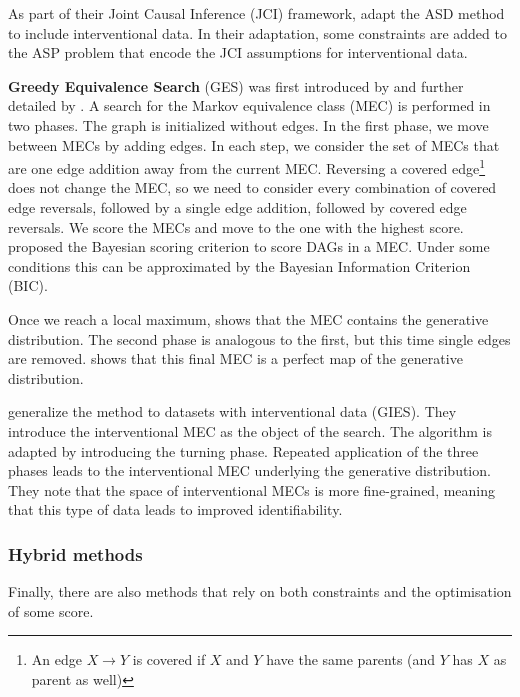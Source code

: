 As part of their Joint Causal Inference (JCI) framework, \citet{mooij2016joint} adapt the ASD method to include interventional data. In their adaptation, some constraints are added to the ASP problem that encode the JCI assumptions for interventional data.

\textbf{Greedy Equivalence Search} (GES) was first introduced by \citet{meek1997graphical} and further detailed by \citet{chickering2002optimal}. A search for the Markov equivalence class (MEC) is performed in two phases. The graph is initialized without edges. In the first phase, we move between MECs by adding edges. In each step, we consider the set of MECs that are one edge addition away from the current MEC. Reversing a covered edge\footnote{An edge $X\to Y$ is covered if $X$ and $Y$ have the same parents (and $Y$ has $X$ as parent as well)} does not change the MEC, so we need to consider every combination of covered edge reversals, followed by a single edge addition, followed by covered edge reversals. We score the MECs and move to the one with the highest score. \citet{meek1997graphical} proposed the Bayesian scoring criterion to score DAGs in a MEC. Under some conditions this can be approximated by the Bayesian Information Criterion (BIC). 

Once we reach a local maximum, \citet{chickering2002optimal} shows that the MEC contains the generative distribution. The second phase is analogous to the first, but this time single edges are removed. \citet{chickering2002optimal} shows that this final MEC is a perfect map of the generative distribution.

\citet{hauser2012characterization} generalize the method to datasets with interventional data (GIES). They introduce the interventional MEC as the object of the search. The algorithm is adapted by introducing the turning phase. Repeated application of the three phases leads to the interventional MEC underlying the generative distribution. They note that the space of interventional MECs is more fine-grained, meaning that this type of data leads to improved identifiability.


\subsubsection{Hybrid methods}

Finally, there are also methods that rely on both constraints and the optimisation of some score.

